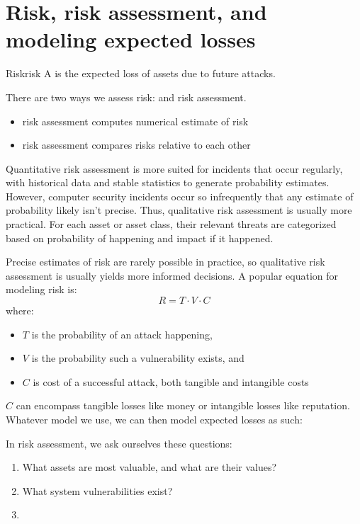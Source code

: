 \documentclass[code]{amznotes}
\begin{document}
\section{Risk, risk assessment, and modeling expected losses}

\begin{dfnbox}{Risk}{risk}
    A  is the expected loss of assets due to future attacks.
\end{dfnbox}

There are two ways we assess risk:  and  risk assessment.
\begin{itemize}
    \item {} risk assessment computes numerical estimate of risk
    \item {} risk assessment compares risks relative to each other
\end{itemize}

Quantitative risk assessment is more suited for incidents that occur regularly, with historical data and stable statistics to generate probability estimates. However, computer security incidents occur so infrequently that any estimate of probability likely isn't precise. Thus, qualitative risk assessment is usually more practical. For each asset or asset class, their relevant threats are categorized based on probability of happening and impact if it happened.

Precise estimates of risk are rarely possible in practice, so qualitative risk assessment is usually yields more informed decisions. A popular equation for modeling risk is:
\[ R = T \cdot V \cdot C \]
where:
\begin{itemize}
    \item $T$ is the probability of an attack happening,
    \item $V$ is the probability such a vulnerability exists, and
    \item $C$ is cost of a successful attack, both tangible and intangible costs
\end{itemize}

$C$ can encompass tangible losses like money or intangible losses like reputation. Whatever model we use, we can then model expected losses as such:

In risk assessment, we ask ourselves these questions:
\begin{enumerate}
    \item What assets are most valuable, and what are their values?
    \item What system vulnerabilities exist?
    \item
\end{enumerate}
\end{document}
